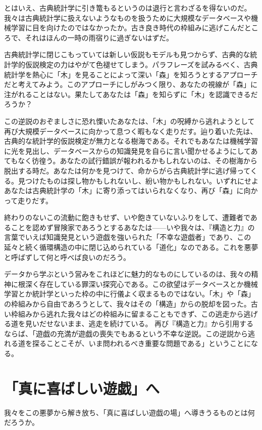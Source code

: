 とはいえ、古典統計学に引き篭もるというのは退行と言わざるを得ないのだ。我々は古典統計学に扱えないようなものを扱うために大規模なデータベースや機械学習に目を向けたのではなかったか。古き良き時代の枠組みに逃げこんだところで、それはほんの一時の雨宿りに過ぎないはずだ。

古典統計学に閉じこもっていては新しい仮説もモデルも見つからず、古典的な統計学的仮説検定の力はやがて色褪せてしまう。パラフレーズを試みるべく、古典統計学を熱心に「木」を見ることによって深い「森」を知ろうとするアプローチだと考えてみよう。このアプローチにしがみつく限り、あなたの視線が「森」に注がれることはない。果たしてあなたは「森」を知らずに「木」を認識できるだろうか？

この逆説のおぞましさに恐れ慄いたあなたは、「木」の呪縛から逃れようとして再び大規模データベースに向かって息つく暇もなく走りだす。辿り着いた先は、古典的な統計学的仮説検定が無力となる樹海である。それでもあなたは機械学習に光を見出し、データベースからの知識発見を自らに言い聞かせるようにしてあてもなく彷徨う。あなたの試行錯誤が報われるかもしれないのは、その樹海から脱出する時だ。あなたは何かを見つけて、命からがら古典統計学に逃げ帰ってくる。見つけたものは探し物かもしれないし、紛い物かもしれない。いずれにせよあなたは古典統計学の「木」に寄り添ってはいられなくなり、再び「森」に向かって走りだす。

終わりのないこの流動に飽きもせず、いや飽きていないふりをして、遭難者であることを認めず冒険家であろうとするあなたは------いや我々は、『構造と力』の言葉でいえば知識発見という遊戯を強いられた「不幸な遊戯者」であり、この延々と続く循環構造の中に閉じ込められている「道化」なのである。これを悪夢と呼ばずして何と呼べば良いのだろう。

データから学ぶという営みをこれほどに魅力的なものにしているのは、我々の精神に根深く存在している罪深い探究心である。この欲望はデータベースとか機械学習とか統計学といった枠の中に行儀よく収まるものではない。「木」や「森」の枠組みから自由であろうとして、我々はその「構造」からの脱却を図った。古い枠組みから逃れた我々はどの枠組みに留まることもできず、この逃走から逃げる道を見いだせないまま、逃走を続けている。
再び『構造と力』から引用するならば、「遊戯の充満が遊戯の喪失でもあるという不幸な逆説。この逆説から逃れる道を探ることこそが、いま問われるべき重要な問題である」ということになる。

\section{「真に喜ばしい遊戯」へ}
我々をこの悪夢から解き放ち、「真に喜ばしい遊戯の場」へ導きうるものとは何だろうか。

